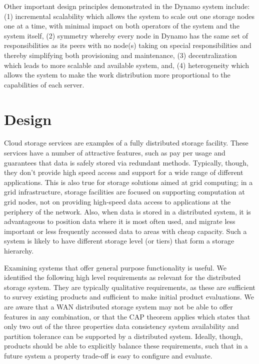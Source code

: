 \documentclass[11pt]{article}
\begin{document}
Other important design principles demonstrated in the Dynamo system
include: (1) incremental scalability which allows the system to scale
out one storage nodes one at a time, with minimal impact on both
operators of the system and the system itself, (2) symmetry whereby
every node in Dynamo has the same set of responsibilities as its peers
with no node(s) taking on special responsibilities and thereby
simplifying both provisioning and maintenance, (3) decentralization
which leads to more scalable and available system, and, (4)
heterogeneity which allows the system to make the work distribution
more proportional to the capabilities of each server.


\section{Design}

Cloud storage services are examples of a fully distributed storage 
facility. These services have a number of attractive features, such 
as pay per usage and guarantees that data is safely stored via 
redundant methods. Typically, though, they don't provide high speed 
access and support for a wide range of different applications. This 
is also true for storage solutions aimed at grid computing; in a grid 
infrastructure, storage facilities are focused on supporting computation 
at grid nodes, not on providing high-speed data access to applications at 
the periphery  of the network.  Also, when data is stored in a distributed 
system, it is advantageous to position data where it is most often used, 
and migrate less important or less frequently accessed data to areas with 
cheap capacity. Such a system is likely to have different storage level 
(or tiers) that form a storage hierarchy. 

Examining systems that offer general purpose functionality is useful. We 
identified the following high level requirements as relevant for the 
distributed storage system. They are typically qualitative requirements, 
as these are sufficient to survey existing products and sufficient to make 
initial product evaluations. We are aware that a WAN distributed storage 
system may not be able to offer features in any combination, or that the 
CAP theorem applies which states that only two out of the three properties 
data consistency system availability and partition tolerance can be 
supported by a distributed system. Ideally, though, products should be able 
to explicitly balance these requirements, such that in a future system a 
property trade-off is easy to configure and evaluate.
\end{document}

